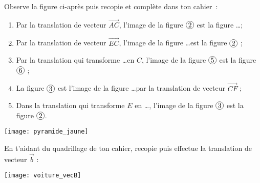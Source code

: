 \begin{exercice}
Observe la figure ci-après puis recopie et complète dans ton cahier :
\begin{enumerate}
 \item Par la translation de vecteur $\overrightarrow{AC}$, l’image de la figure $\circled{2}$ est la figure \ldots ;
 \item Par la translation de vecteur $\overrightarrow{EC}$, l’image de la figure \ldots est la figure $\circled{2}$ ;
 \item Par la translation qui transforme \ldots en $C$, l’image de la figure $\circled{5}$ est la figure $\circled{6}$ ;
 \item La figure $\circled{3}$ est l’image de la figure \ldots par la translation de vecteur $\overrightarrow{CF}$ ;
 \item Dans la translation qui transforme $E$ en \ldots, l’image de la figure $\circled{3}$ est la figure $\circled{2}$.
 \end{enumerate}
\begin{center} \texttt{[image: pyramide\_jaune]} \end{center}
\end{exercice}


\begin{exercice}
En t'aidant du quadrillage de ton cahier, recopie puis effectue la translation de vecteur $\vec{b}$ :
\begin{center} \texttt{[image: voiture\_vecB]} \end{center}
\end{exercice}


